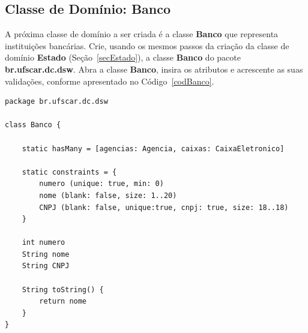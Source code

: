 \newpage

\subsection{Classe de Domínio: Banco}\label{secBanco}

\vspace{0.5cm}

A próxima classe de  domínio a ser criada é a classe  {\bf Banco} que representa
instituições bancárias.  Crie,  usando os mesmos passos da  criação da classe de
domínio  {\bf Estado} (Seção~\ref{secEstado}),  a classe  {\bf Banco}  do pacote
{\bf  br.ufscar.dc.dsw}.  Abra  a  classe  {\bf Banco},  insira  os atributos  e
acrescente as suas validações, conforme apresentado no Código~\ref{codBanco}. 

\begin{lstlisting}[caption=Classe  de   domínio  {\bf  Banco},   frame  =  trBL,
    float=htbp, label=codBanco] 
package br.ufscar.dc.dsw

class Banco {

    static hasMany = [agencias: Agencia, caixas: CaixaEletronico]

    static constraints = {
        numero (unique: true, min: 0)
        nome (blank: false, size: 1..20)
        CNPJ (blank: false, unique:true, cnpj: true, size: 18..18)
    }

    int numero
    String nome
    String CNPJ

    String toString() {
        return nome
    }
}
\end{lstlisting}

\hspace{1cm}\\
\hspace{1cm}\\


